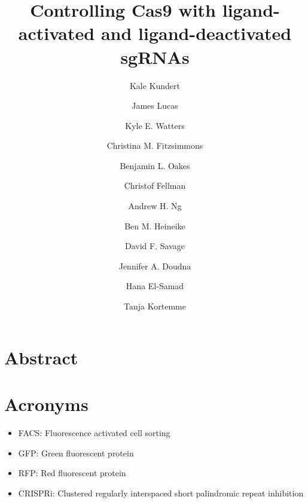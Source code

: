 \documentclass[10pt,oneside]{article}
\begin{document}
\title{Controlling Cas9 with ligand-activated and ligand-deactivated sgRNAs}
\author[1]{Kale Kundert}
\author[1]{James Lucas}
\author[2]{Kyle E. Watters}
\author[1]{Christina M. Fitzsimmons}
\author[2]{Benjamin L. Oakes}
\author[2]{Christof Fellman}
\author[3]{Andrew H. Ng}
\author[3]{Ben M. Heineike}
\author[2]{David F. Savage}
\author[2]{Jennifer A. Doudna}
\author[3]{Hana El-Samad}
\author[1]{Tanja Kortemme}
\date{}

\maketitle{}


\section{Abstract}

\section{Acronyms}

\begin{itemize}
    \item FACS: Fluorescence activated cell sorting
    \item GFP: Green fluorescent protein
    \item RFP: Red fluorescent protein
    \item CRISPRi: Clustered regularly interspaced short palindromic repeat inhibition
\end{itemize}
\end{document}
